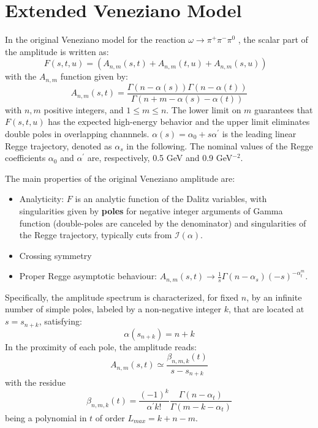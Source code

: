 \documentclass[a4paper,10pt]{report}
\newcommand{\decay}{$\omega \rightarrow \pi^+ \pi^- \pi^0$ }
\begin{document}
\section{Extended Veneziano Model}\label{sec:model}

In the original Veneziano model \cite{Veneziano} for the reaction \decay, the scalar part of the amplitude is written as:
\begin{equation}
F(s,t,u)=(A_{n,m}(s,t)+A_{n,m}(t,u)+A_{n,m}(s,u)) \; \; \;
\end{equation}
with the $A_{n,m}$ function given by:
\begin{equation}
A_{n,m}(s,t)=\frac{ \Gamma(n-\alpha(s)) \Gamma(n-\alpha(t))}{\Gamma(n+m-\alpha(s)-\alpha(t))} 
\end{equation}
with $n,m$ positive integers, and $1\leq m \leq n$. 
The lower limit on $m$ guarantees that $F(s, t, u)$ has the expected high-energy behavior and the upper limit eliminates double poles in overlapping channnels.
$\alpha(s)=\alpha_0+s\alpha^\prime$ is the leading linear Regge trajectory, denoted as $\alpha_s$ in the following. The nominal values of the Regge coefficients $\alpha_0$ and $\alpha^{\prime}$ are, respectively, 0.5 GeV and 0.9 GeV$^{-2}$.

The main properties of the original Veneziano amplitude are:
\begin{itemize}
\item Analyticity: $F$ is an analytic function of the Dalitz variables, with singularities given by \textbf{poles} for negative integer arguments of Gamma function 
(double-poles are canceled by the denominator) and singularities of the Regge trajectory, typically cuts from $\mathcal{I}(\alpha)$.
\item Crossing symmetry
\item Proper Regge asymptotic behaviour: $A_{n,m}(s,t) \rightarrow \frac{1}{s} \Gamma(n-\alpha_s) (-s)^{-\alpha^m_t}$.
\end{itemize}

Specifically, the amplitude spectrum is characterized, for fixed $n$, by an infinite number of simple poles,
labeled by a non-negative integer $k$, that are located at $s=s_{n+k}$, satisfying:
\begin{equation}\label{eq:poleloc}
\alpha(s_{n+k})=n+k
\end{equation}
In the proximity of each pole, the amplitude reads:
\begin{equation}
A_{n,m}(s,t) \simeq \frac{\beta_{n,m,k}(t)}{s-s_{n+k}}
\end{equation}
with the residue
\begin{equation}
\beta_{n,m,k}(t) = \frac{(-1)^k}{\alpha^{\prime}k!}\frac{\Gamma(n-\alpha_t)}{\Gamma(m-k-\alpha_t)}
\end{equation}
being a polynomial in $t$ of order $L_{max}=k+n-m$. 
\end{document}
